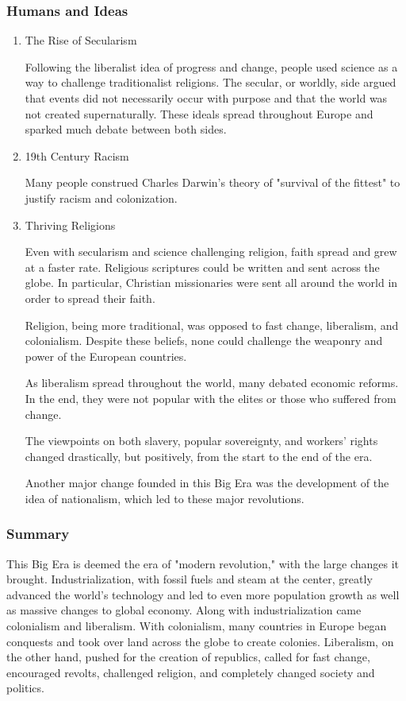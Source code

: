 \documentclass[11pt]{article}
\begin{document}
\subsubsection{Humans and Ideas}
\label{sec:org45f2211}
\begin{enumerate}
\item The Rise of Secularism
\label{sec:org4c03bf2}

Following the liberalist idea of progress and change, people used science as a way to challenge traditionalist religions. The secular, or worldly, side argued that events did not necessarily occur with purpose and that the world was not created supernaturally. These ideals spread throughout Europe and sparked much debate between both sides.

\item 19th Century Racism
\label{sec:org69691f8}

Many people construed Charles Darwin's theory of "survival of the fittest" to justify racism and colonization.

\item Thriving Religions
\label{sec:org0318a23}

Even with secularism and science challenging religion, faith spread and grew at a faster rate. Religious scriptures could be written and sent across the globe. In particular, Christian missionaries were sent all around the world in order to spread their faith.

Religion, being more traditional, was opposed to fast change, liberalism, and colonialism. Despite these beliefs, none could challenge the weaponry and power of the European countries.

As liberalism spread throughout the world, many debated economic reforms. In the end, they were not popular with the elites or those who suffered from change.

The viewpoints on both slavery, popular sovereignty, and workers' rights changed drastically, but positively, from the start to the end of the era.

Another major change founded in this Big Era was the development of the idea of nationalism, which led to these major revolutions.
\end{enumerate}

\subsubsection{Summary}
\label{sec:org2c48a6f}

This Big Era is deemed the era of "modern revolution," with the large changes it brought. Industrialization, with fossil fuels and steam at the center, greatly advanced the world's technology and led to even more population growth as well as massive changes to global economy. Along with industrialization came colonialism and liberalism. With colonialism, many countries in Europe began conquests and took over land across the globe to create colonies. Liberalism, on the other hand, pushed for the creation of republics, called for fast change, encouraged revolts, challenged religion, and completely changed society and politics.
\end{document}
